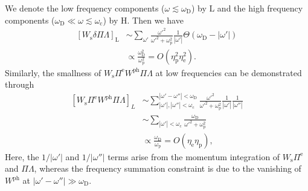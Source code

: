 \documentclass[%
 reprint,
superscriptaddress,
 amsmath,amssymb,
 aps,
prx,
]{revtex4-2}
\newcommand{\txc}{\text{c}}
\newcommand{\txe}{\text{e}}
\newcommand{\txp}{\text{p}}
\newcommand{\txs}{\text{s}}
\newcommand{\txD}{\text{D}}
\newcommand{\txH}{\text{H}}
\newcommand{\txL}{\text{L}}
\newcommand{\txph}{\text{ph}}
\newcommand{\pcf}{\Lambda} %
\begin{document}
\begin{appendices}
We denote the low frequency components ($\omega \lesssim  \omega_\txD$) by $\txL$ and the high frequency components ($\omega_\txD \ll \omega \lesssim \omega_\txc$) by $\txH$.
Then we have
\begin{equation}
  \begin{split}
  \left[W_\txs\delta\Pi \pcf\right]_\text{L}&\sim\sum_{\omega'}\frac{{\omega'}^2}{{\omega'}^2+\omega_\txp^2}
  \frac{1}{|\omega'|}\Theta(\omega_\txD-|\omega'|) \\
  &\propto \frac{\omega_\txD^2}{\omega_\txp^2}=O(\eta_\txp^2\eta_\txe^2).
    \end{split}
\end{equation}
Similarly, the smallness of $W_\txs\Pi^{\txe} W^{\txph}\Pi \pcf$ at low frequencies can be demonstrated through
\begin{equation}
    \begin{split}
\label{eq:WPiWPiR}
  \left[W_\txs\Pi^{\txe} W^{\txph}\Pi \pcf\right]_{L} &\sim\sum_{|\omega'|, |\omega''|<\omega_\txc}^{|\omega'-\omega''|<\omega_\txD}\frac{{\omega'}^2}{{\omega'}^2+\omega_\txp^2}
  \frac{1}{|\omega'|}\frac{1}{|\omega''|}\\
  &\sim\sum_{|\omega'|<\omega_\txc}\frac{\omega_\txD}{{\omega'}^2+\omega_\txp^2}\\
  &\propto \frac{{\omega_\txD}}{\omega_\txp}=O(\eta_\txe\eta_\txp),
    \end{split}
\end{equation}
Here, the $1/|\omega'|$ and $1/|\omega''|$ terms arise from the momentum integration of $W_\txs\Pi^{\txe}$ and $\Pi \pcf $, whereas the frequency summation constraint is due to the vanishing of $W^{\txph}$ at $|\omega'-\omega''|\gg\omega_\txD$. 


\end{appendices}
\end{document}
